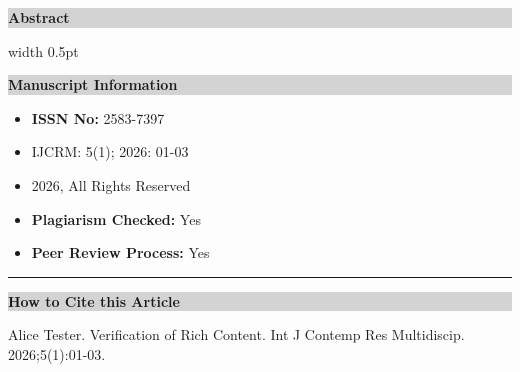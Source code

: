 \documentclass[12pt,a4paper]{article}
\begin{document}
\noindent
\begin{tcolorbox}[
    colback=white,
    colframe=black!70,
    boxrule=0.6pt,
    arc=0pt,
    left=0pt,
    right=0pt,
    top=0pt,
    bottom=0pt,
]

\begin{minipage}[t]{0.64\textwidth}

\fontsize{9}{11}\selectfont

\noindent
\colorbox{lightgray}{
\parbox{\dimexpr\linewidth-2\fboxsep}{
\vspace{2pt}
\textcolor{journalblue}{\textbf{Abstract}}
\vspace{2pt}
}}

\vspace{4pt}



\end{minipage}
\hfill
\vrule width 0.5pt
\hfill
\begin{minipage}[t]{0.34\textwidth}

\fontsize{8.5}{10}\selectfont

\noindent
\colorbox{lightgray}{
\parbox{\dimexpr\linewidth-2\fboxsep}{
\vspace{2pt}
\centering \textcolor{journalblue}{\textbf{Manuscript Information}}
\vspace{2pt}
}}

\begin{itemize}[leftmargin=*, itemsep=-4pt]
\item \textbf{ISSN No:} 2583-7397
\item IJCRM: 5(1); 2026: 01-03
\item \textcopyright{}2026, All Rights Reserved
\item \textbf{Plagiarism Checked:} Yes
\item \textbf{Peer Review Process:} Yes
\end{itemize}

\vspace{4pt}
\hrule
\vspace{4pt}

\noindent
\colorbox{lightgray}{
\parbox{\dimexpr\linewidth-2\fboxsep}{
\vspace{2pt}
\centering \textcolor{journalblue}{\textbf{How to Cite this Article}}
\vspace{2pt}
}}

\vspace{2pt}

Alice Tester. Verification of Rich Content. Int J Contemp Res Multidiscip. 2026;5(1):01-03.


\end{minipage}
\end{tcolorbox}
\end{document}
